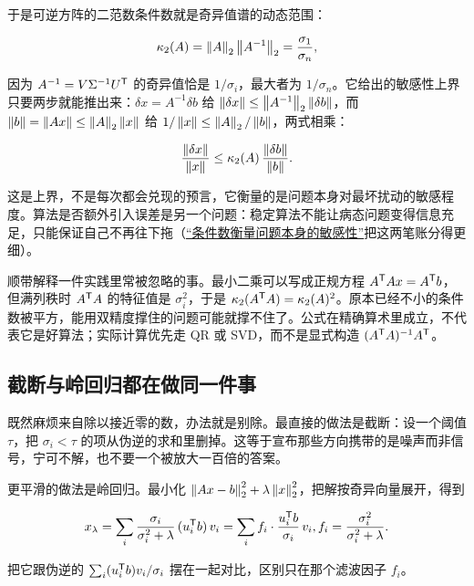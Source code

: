 于是可逆方阵的二范数条件数就是奇异值谱的动态范围：

\[
\kappa_2(A)=\left\lVert A\right\rVert_2\left\lVert A^{-1}\right\rVert_2=\frac{\sigma_1}{\sigma_n},
\]

因为 \(A^{-1}=V\Sigma^{-1}U^{\mathsf{T}}\) 的奇异值恰是 \(1/\sigma_i\)，最大者为 \(1/\sigma_n\)。它给出的敏感性上界只要两步就能推出来：\(\delta x=A^{-1}\delta b\) 给 \(\left\lVert\delta x\right\rVert\le\left\lVert A^{-1}\right\rVert_2\left\lVert\delta b\right\rVert\)，而 \(\left\lVert b\right\rVert=\left\lVert Ax\right\rVert\le\left\lVert A\right\rVert_2\left\lVert x\right\rVert\) 给 \(1/\left\lVert x\right\rVert\le\left\lVert A\right\rVert_2/\left\lVert b\right\rVert\)，两式相乘：

\[
\frac{\left\lVert\delta x\right\rVert}{\left\lVert x\right\rVert}\le\kappa_2(A)\,\frac{\left\lVert\delta b\right\rVert}{\left\lVert b\right\rVert} .
\]

这是上界，不是每次都会兑现的预言，它衡量的是问题本身对最坏扰动的敏感程度。算法是否额外引入误差是另一个问题：稳定算法不能让病态问题变得信息充足，只能保证自己不再往下拖（\hyperref[sec:08-Numerical-Analysis/01-Floating-Point-and-Error/03]{``条件数衡量问题本身的敏感性''}把这两笔账分得更细）。

顺带解释一件实践里常被忽略的事。最小二乘可以写成正规方程 \(A^{\mathsf{T}}Ax=A^{\mathsf{T}}b\)，但满列秩时 \(A^{\mathsf{T}}A\) 的特征值是 \(\sigma_i^2\)，于是 \(\kappa_2(A^{\mathsf{T}}A)=\kappa_2(A)^2\)。原本已经不小的条件数被平方，能用双精度撑住的问题可能就撑不住了。公式在精确算术里成立，不代表它是好算法；实际计算优先走 QR 或 SVD，而不是显式构造 \((A^{\mathsf{T}}A)^{-1}A^{\mathsf{T}}\)。

\subsection{截断与岭回归都在做同一件事}

既然麻烦来自除以接近零的数，办法就是别除。最直接的做法是截断：设一个阈值 \(\tau\)，把 \(\sigma_i<\tau\) 的项从伪逆的求和里删掉。这等于宣布那些方向携带的是噪声而非信号，宁可不解，也不要一个被放大一百倍的答案。

更平滑的做法是岭回归。最小化 \(\left\lVert Ax-b\right\rVert_2^2+\lambda\left\lVert x\right\rVert_2^2\)，把解按奇异向量展开，得到

\[
x_\lambda=\sum_{i}\frac{\sigma_i}{\sigma_i^2+\lambda}\,(u_i^{\mathsf{T}}b)\,v_i
=\sum_i f_i\cdot\frac{u_i^{\mathsf{T}}b}{\sigma_i}\,v_i,
\space
f_i=\frac{\sigma_i^2}{\sigma_i^2+\lambda}.
\]

把它跟伪逆的 \(\sum_i(u_i^{\mathsf{T}}b)v_i/\sigma_i\) 摆在一起对比，区别只在那个滤波因子 \(f_i\)。


